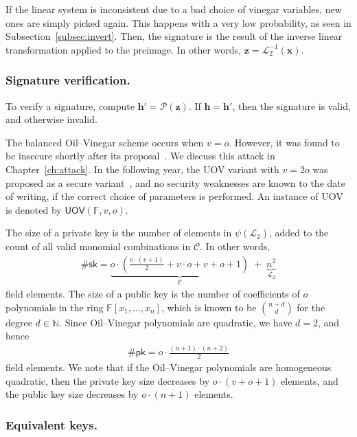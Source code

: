 \documentclass[12pt, a4paper, oneside]{memoir}
\theoremstyle{definition}
\begin{document}
If the linear system is inconsistent due to a bad choice of vinegar variables, new ones are simply picked again. This happens with a very low probability, as seen in Subsection~\ref{subsec:invert}. Then, the signature is the result of the inverse linear transformation applied to the preimage. In other words, $\mathbf{z} = \mathcal{L}_{2}^{-1}(\mathbf{x})$.

\subsubsection{Signature verification.}

To verify a signature, compute $\mathbf{h'} = \mathcal{P}(\mathbf{z})$. If $\mathbf{h} = \mathbf{h'}$, then the signature is valid, and otherwise invalid.

The balanced Oil--Vinegar scheme occurs when $v = o$. However, it was found to be insecure shortly after its proposal~\cite{Kipnis:199808}. We discuss this attack in Chapter~\ref{ch:attack}. In the following year, the UOV variant with $v = 2o$ was proposed as a secure variant~\cite{Kipnis:199904}, and no security weaknesses are known to the date of writing, if the correct choice of parameters is performed. An instance of UOV is denoted by $\mathsf{UOV}(\mathbb{F}, v, o)$. 

The size of a private key is the number of elements in $\psi(\mathcal{L}_{2})$, added to the count of all valid monomial combinations in $\mathcal{C}$. In other words,
\begin{align}
  \#\mathsf{sk} = \underbrace{o \cdot \left( \frac{v \cdot (v + 1)}{2} + v \cdot o + v + o + 1 \right)}_{\mathcal{C}} \;
    + \; \underbrace{n^{2}}_{\mathcal{L}_{2}}
\end{align}
field elements. The size of a public key is the number of coefficients of $o$ polynomials in the ring $\mathbb{F}[x_{1}, \dots, x_{n}]$, which is known to be $\binom{n + d}{d}$ for the degree $d \in \mathbb{N}$. Since Oil--Vinegar polynomials are quadratic, we have $d = 2$, and hence
\begin{align}
  \#\mathsf{pk} = o \cdot \frac{(n + 1) \cdot (n + 2)}{2}
\end{align}
field elements. We note that if the Oil--Vinegar polynomials are homogeneous quadratic, then the private key size decreases by $o \cdot (v + o + 1)$ elements, and the public key size decreases by $o \cdot (n + 1)$ elements.

\subsubsection{Equivalent keys.}
\end{document}

